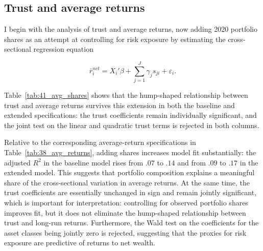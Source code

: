 \subsection{Trust and average returns}

\par I begin with the analysis of trust and average returns, now adding 2020 portfolio shares as an attempt at controlling for risk exposure by estimating the cross-sectional regression equation 

\[
\bar{r}^{net}_{i}
=
X_{i}'\beta
+ \sum_{j=1}^J \gamma_j s_{ji}
+ \varepsilon_{i}.
\]

\par Table~\ref{tab:41_avg_shares} shows that the hump-shaped relationship between trust and average returns survives this extension in both the baseline and extended specifications: the trust coefficients remain individually significant, and the joint test on the linear and quadratic trust terms is rejected in both columns.

\begin{table}[!t]
\centering
\begingroup
\setlength{\abovecaptionskip}{2pt}%
\setlength{\belowcaptionskip}{0pt}%
\caption{\textbf{Trust and Average Returns to Net Wealth with Portfolio-Share Controls}\label{tab:41_avg_shares}}
\endgroup
\begin{threeparttable}
\begingroup
\setlength{\tabcolsep}{2pt}%
\renewcommand{\arraystretch}{0.70}%
\scriptsize%
\resizebox{\textwidth}{!}{%
%
}%
\endgroup
\begin{tablenotes}[flushleft]
\scriptsize
\item {}%
\end{tablenotes}
\end{threeparttable}
\end{table}


\par Relative to the corresponding average-return specifications in Table~\ref{tab:38_avg_returns}, adding shares increases model fit substantially: the adjusted $R^2$ in the baseline model rises from $.07$ to $.14$ and from $.09$ to $.17$ in the extended model. This suggests that portfolio composition explains a meaningful share of the cross-sectional variation in average returns. At the same time, the trust coefficients are essentially unchanged in sign and remain jointly significant, which is important for interpretation: controlling for observed portfolio shares improves fit, but it does not eliminate the hump-shaped relationship between trust and long-run returns. Furthermore, the Wald test on the coefficients for the asset classes being jointly zero is rejected, suggesting that the proxies for risk exposure are predictive of returns to net wealth. 

